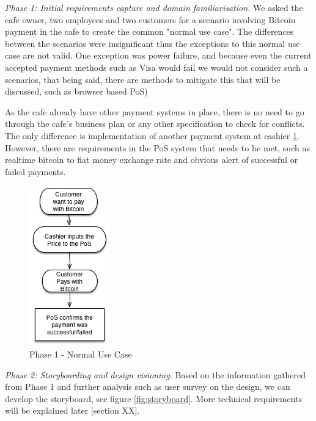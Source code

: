 \textit{Phase 1: Initial requirements capture and domain familiarisation.} We asked the cafe owner, two employees and two customers for a scenario involving Bitcoin payment in the cafe to create the common "normal use case". The differences between the scenarios were insignificant thus the exceptions to this normal use case are not valid. One exception was power failure, and because even the current accepted payment methods such as Visa would fail we would not consider such a scenarios, that being said, there are methods to mitigate this that will be discussed, such as browser based PoS)


As the cafe already have other payment systems in place, there is no need to go through the cafe's business plan or any other specification to check for conflicts. The only difference is implementation of another payment system at cashier \ref{fig:phase1}.
However, there are requirements in the PoS system that needs to be met, such as realtime bitcoin to fiat money exchange rate and obvious alert of successful or failed payments.

\begin{figure}[h]
\centering
\includegraphics[scale=0.5]{fig/RE_Scenario_Phase1}
  \caption{Phase 1 - Normal Use Case}
\label{fig:phase1}
\end{figure}


\textit{Phase 2: Storyboarding and design visioning.}
Based on the information gathered from Phase 1 and further analysis such as user survey on the design, we can develop the storyboard, see figure \ref{fig:storyboard}. More technical requirements will be explained later [section XX].

